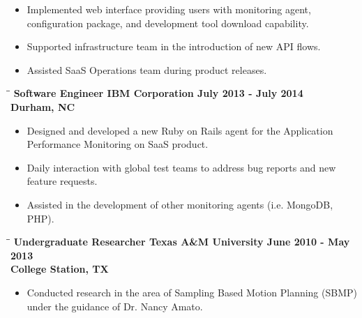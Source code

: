 \documentclass[8pt]{res}
\begin{document}
\begin{resume}
\begin{itemize}
      \item Implemented web interface providing users with monitoring agent, configuration package, and development tool download capability.
      \item Supported infrastructure team in the introduction of new API flows.
      \item Assisted SaaS Operations team during product releases.
    \end{itemize}\vspace{-18pt}      %
    \begin{tabbing}
      \hspace{2.3in}\= \hspace{2.6in}\= \kill %
      \bf Software Engineer \>\bf IBM Corporation \>\bf July 2013 - July 2014\\ \>\bf Durham, NC
    \end{tabbing}\vspace{-10pt}      %
    \begin{itemize}
      \item Designed and developed a new Ruby on Rails agent for the Application Performance Monitoring on SaaS product.
      \item Daily interaction with global test teams to address bug reports and new feature requests.
      \item Assisted in the development of other monitoring agents (i.e. MongoDB, PHP).
    \end{itemize}\vspace{-18pt}      %
    \begin{tabbing}
      \hspace{2.3in}\= \hspace{2.6in}\= \kill %
      \bf Undergraduate Researcher \>\bf Texas A\&M University \>\bf June 2010 - May 2013\\ \>\bf College Station, TX
    \end{tabbing}\vspace{-10pt}      %
    \begin{itemize}
      \item Conducted research in the area of Sampling Based Motion Planning (SBMP) under the guidance of Dr. Nancy Amato.

\end{itemize}
\end{resume}
\end{document}

